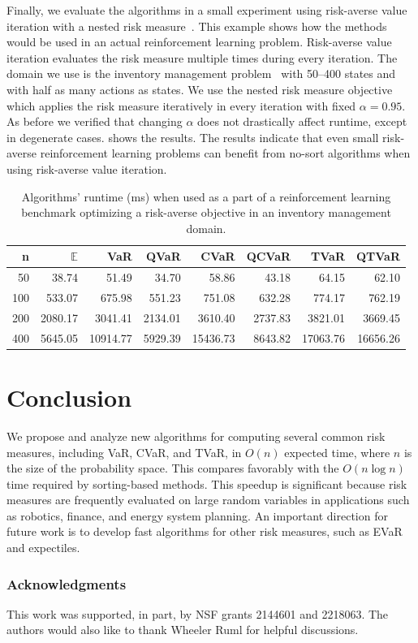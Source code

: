 Finally, we evaluate the algorithms in a small experiment using risk-averse value iteration with a nested risk measure~\cite{Behzadian2021a,Hau2023a,Hau2023}. This example shows how the methods would be used in an actual reinforcement learning problem. Risk-averse value iteration evaluates the risk measure multiple times during every iteration. The domain we use is the inventory management problem~\cite{Hau2023} with 50--400 states and with half as many actions as states. We use the nested risk measure objective~\cite{Hau2023} which applies the risk measure iteratively in every iteration with fixed $\alpha=0.95$. As before we verified that changing $\alpha$ does not drastically affect runtime, except in degenerate cases.  shows the results. The results indicate that even small risk-averse reinforcement learning problems can benefit from no-sort algorithms when using risk-averse value iteration.

\begin{table}
  \centering
  \caption{Algorithms' runtime (ms) when used as a part of a reinforcement learning benchmark optimizing a risk-averse objective in an inventory management domain.}
  \label{tab:rl-inventory}
\begin{tabular}{rrrrrrrr}
\toprule
n & $\mathbb{E}$ & VaR & QVaR & CVaR & QCVaR & TVaR & QTVaR \\
\midrule
50 & 38.74 & 51.49 & 34.70 & 58.86 & 43.18 & 64.15 & 62.10\\
100 & 533.07 & 675.98 & 551.23 & 751.08 & 632.28 & 774.17 & 762.19\\
200 & 2080.17 & 3041.41 & 2134.01 & 3610.40 & 2737.83 & 3821.01 & 3669.45\\
400 & 5645.05 & 10914.77 & 5929.39 & 15436.73 & 8643.82 & 17063.76 & 16656.26\\
\bottomrule
\end{tabular}
\end{table}
 

\section{Conclusion}

We propose and analyze new algorithms for computing several common risk measures, including VaR, CVaR, and TVaR, in $O(n)$ expected time, where $n$ is the size of the probability space. This compares favorably with the $O(n \log n)$ time required by sorting-based methods.  This speedup is significant because risk measures are frequently evaluated on large random variables in applications such as robotics, finance, and energy system planning. An important direction for future work is to develop fast algorithms for other risk measures, such as EVaR and expectiles.

\subsubsection*{Acknowledgments}

This work was supported, in part, by NSF grants 2144601 and 2218063. The authors would also like to thank Wheeler Ruml for helpful discussions.
